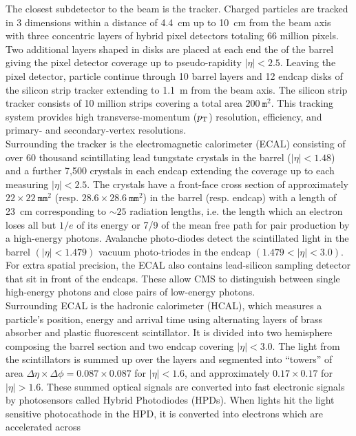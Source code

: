 The closest subdetector to the beam is the tracker. Charged particles are tracked in 
3 dimensions within a distance of 4.4~cm up to 10~cm from the beam axis with three concentric layers of hybrid 
pixel detectors totaling 66 million pixels. Two additional layers shaped in disks are placed at each 
end the of the barrel giving the pixel detector coverage up to pseudo-rapidity $|\eta| < 2.5$.
Leaving the pixel detector, particle continue through 10 barrel layers and 12 endcap disks 
of the silicon strip tracker extending to 1.1~m from the beam axis. The silicon strip tracker
consists of 10 million strips covering a total area $200~\texttt{m}^2$.  This tracking system
provides high transverse-momentum ($p_{\mathrm{T}}$) resolution, efficiency, and primary- and secondary-vertex
resolutions.\\
\indent Surrounding the tracker is the electromagnetic calorimeter (ECAL) consisting of over 60 thousand scintillating 
lead tungstate crystals in the barrel ($|\eta| < 1.48$) and a further 7,500 crystals in each endcap extending
the coverage up to each measuring $|\eta| < 2.5$. The crystals have a front-face cross section
of approximately $22 \times 22~\texttt{mm}^2$ (resp. $28.6 \times 28.6~\texttt{mm}^2$) in the barrel (resp. endcap) with a
length of 23~cm corresponding to $\sim25$ radiation lengths, i.e. the length which an electron loses
all but $1/e$ of its energy or 7/9 of the mean free path for pair production by a high-energy photons.  
Avalanche photo-diodes detect the scintillated light in the barrel $(|\eta| < 1.479)$ vacuum photo-triodes 
in the endcap $(1.479 < |\eta| < 3.0)$. For extra spatial precision, the ECAL also contains lead-silicon 
sampling detector that sit in front of the endcaps. These allow CMS to distinguish between single high-energy 
photons and close pairs of low-energy photons.\\
\indent Surrounding ECAL is the hadronic calorimeter (HCAL), which measures a particle’s position, 
energy and arrival time using alternating layers of brass absorber and plastic fluorescent scintillator.
It is divided into two hemisphere composing the barrel section and two endcap covering $|\eta| < 3.0$. 
The light from the scintillators is summed up over the layers and segmented into 
``towers'' of area $\Delta\eta \times \Delta\phi = 0.087 \times 0.087$ for $|\eta| < 1.6$, 
and approximately $0.17 \times 0.17$ for $|\eta| > 1.6$. These summed optical signals are converted 
into fast electronic signals by photosensors called Hybrid Photodiodes (HPDs). When lights hit the 
light sensitive photocathode in the HPD, it is converted into electrons which are accelerated across 
